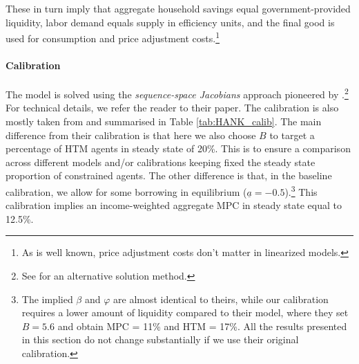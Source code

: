 \documentclass[a4paper,12pt]{article}%
\begin{document}
These in turn imply that aggregate household savings equal government-provided liquidity, labor demand equals supply in efficiency units, and the final good is used for consumption and price adjustment costs.\footnote{As is well known, price adjustment costs don't matter in linearized models.}


\paragraph{Calibration}
The model is solved using the \emph{sequence-space Jacobians} approach pioneered by \cite{ABRS21}.\footnote{See \cite{BayerLuetticke2020} for an alternative solution method.} For technical details, we refer the reader to their paper. The calibration is also mostly taken from \cite{ABRS21} and summarised in Table \ref{tab:HANK_calib}. The main difference from their calibration is that here we also choose $B$ to target a percentage of HTM agents in steady state of 20\%. This is to ensure a comparison across different models and/or calibrations keeping fixed the steady state proportion of constrained agents. The other difference is that, in the baseline calibration, we allow for some borrowing in equilibrium ($\underline{a}=-0.5$).\footnote{The implied $\beta$ and $\varphi$ are almost identical to theirs, while our calibration requires a lower amount of liquidity compared to their model, where they set $B=5.6$ and obtain MPC = 11\% and HTM = 17\%. All the results presented in this section do not change substantially if we use their original calibration.} This calibration implies an income-weighted aggregate MPC in steady state equal to 12.5\%.
\end{document}
